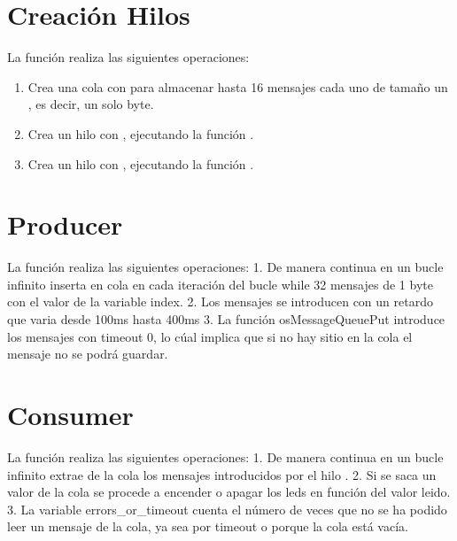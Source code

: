 \documentclass[letterpaper,10pt,english]{sphinxmanual}
\begin{document}
\section{Creación Hilos}
\label{\detokenize{ejemplothreads-queues:creacion-hilos}}
\sphinxAtStartPar
La función  realiza las siguientes operaciones:
\begin{enumerate}
%
\item {} 
\sphinxAtStartPar
Crea una cola con  para almacenar hasta 16 mensajes cada uno de tamaño un , es decir, un solo byte.

\item {} 
\sphinxAtStartPar
Crea un hilo  con , ejecutando la función .

\item {} 
\sphinxAtStartPar
Crea un hilo  con , ejecutando la función .

\end{enumerate}


\section{Producer}
\label{\detokenize{ejemplothreads-queues:producer}}
\sphinxAtStartPar
La función  realiza las siguientes operaciones:
1. De manera continua en un bucle infinito inserta en cola en cada iteración del bucle while 32 mensajes de 1 byte con el valor de la variable index.
2. Los mensajes se introducen con un retardo que varia desde 100ms hasta 400ms
3. La función osMessageQueuePut introduce los mensajes con timeout 0, lo cúal implica que si no hay sitio en la cola el mensaje no se podrá guardar.


\section{Consumer}
\label{\detokenize{ejemplothreads-queues:consumer}}
\sphinxAtStartPar
La función  realiza las siguientes operaciones:
1. De manera continua en un bucle infinito extrae de la cola los mensajes introducidos por el hilo .
2. Si se saca un valor de la cola se procede a encender o apagar los leds en función del valor leido.
3. La variable errors\_or\_timeout cuenta el número de veces que no se ha podido leer un mensaje de la cola, ya sea por timeout o porque la cola está vacía.
\end{document}

